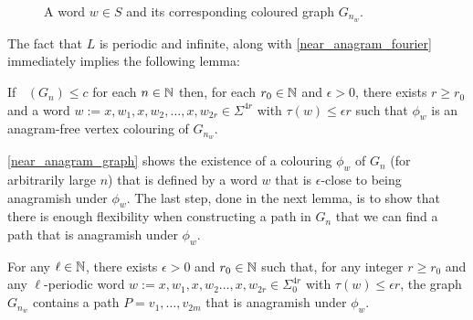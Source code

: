 \documentclass{patmorin}
\DeclareMathOperator{\afcn}{\dot{\chi}_\pi}
\begin{document}
\begin{figure}
    \caption{A word $w\in S$ and its corresponding coloured graph $G_{n_w}$.}
    \label{bigexample}
\end{figure}

The fact that $L$ is periodic and infinite, along with \cref{near_anagram_fourier} immediately implies the following lemma:

\begin{lem}\label{near_anagram_graph}
    If $\afcn(G_n)\le c$ for each $n\in\mathbb{N}$ then, for each $r_0\in\mathbb{N}$ and $\epsilon>0$, there exists $r\ge r_0$ and a word $w:=x,w_1,x,w_2,\ldots,x,w_{2r}\in\Sigma^{4r}$ with $\tau(w)\le\epsilon r$ such that $\phi_w$ is an anagram-free vertex colouring of $G_{n_w}$.
\end{lem}


\cref{near_anagram_graph} shows the existence of a colouring $\phi_w$ of $G_n$ (for arbitrarily large $n$) that is defined by a word $w$ that is $\epsilon$-close to being anagramish under $\phi_w$.  The last step, done in the next lemma, is to show that there is enough flexibility when constructing a path in $G_n$ that we can find a path that is anagramish under $\phi_w$.

\begin{lem}\label{anagramish_path}
    For any $\ell\in\mathbb{N}$, there exists $\epsilon>0$ and $r_0\in\mathbb{N}$ such that, for any integer $r\ge r_0$ and any $\ell$-periodic word $w:=x,w_1,x,w_2\ldots,x,w_{2r}\in\Sigma_0^{4r}$ with $\tau(w)\le\epsilon r$, the graph $G_{n_w}$ contains a path $P=v_1,\ldots,v_{2m}$ that is anagramish under $\phi_w$.
\end{lem}
\end{document}
